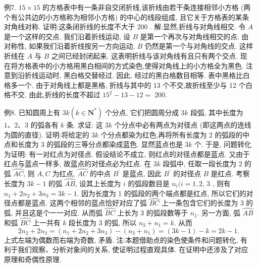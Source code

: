例7. $15 \times 15$ 的方格表中有一条非自交闭折线,该折线由若干条连接相邻小方格 (两个有公共边的小方格称为相邻小方格) 的中心的线段组成, 且它关于方格表的某条对角线对称.
证明:这条闭折线的长度不大于 200 .
解:显然,折线与对角线相交.
令 $A$ 是一个这样的交点.
我们沿着折线运动, 设 $B$ 是第一个再次与对角线相交的点.
由对称性, 如果我们沿着折线按另一方向运动, $B$ 仍然是第一个与对角线的交点.
这样折线在 $A$ 与 $B$ 之间已经封闭起来.
这表明折线与该对角线有且只有两个交点.
现在将方格表中的小方格用黑白相间的方式染色,使得对角线上的小方格全为黑色.
注意到沿折线运动时, 黑白格交替经过.
因此, 经过的黑白格数目相等.
表中黑格比白格多一个.
由于对角线上都是黑格, 折线与其中的 13 个不交,故折线至少与 12 个白格不交.
由此,折线的长度不超过 $15^2-13-12=$ 200.



例8. 已知圆周上有 $3 k\left(k \in \mathbf{N}^*\right)$ 个分点, 它们把圆周分成 $3 k$ 段弧, 其中长度为 $1 、 2 、 3$ 的弧各有 $k$ 条.
求证: 这 $3 k$ 个分点中必有两点为对径点 (即这两点的连线为圆的直径). 
证明:将给定的 $3 k$ 个分点都染为红色,再将所有长度为 2 的弧段的中点和长度为 3 的弧段的三等分点都染成蓝色.
显然蓝点也是 $3 k$ 个.
于是, 问题转化为证明: 有一对红点为对径点.
假设结论不成立, 则红点的对径点都是蓝点.
又由于红点与蓝点一样多, 故蓝点的对径点必为红点.
在 $3 k$ 段弧中, 任取一段长度为 2 的弧 $\overparen{A C}$, 则 $A, C$ 为红点, $\overparen{A C}$ 的中点 $B^{\prime}$ 是蓝点, 因此 $B^{\prime}$ 的对径点 $B$ 是红点.
考察长度为 $3 k-1$ 的弧 $\overparen{A B}$, 设其上长度为 $i$ 的弧段数目是 $n_i(i=1,2$, 3 , 则有 $n_1+2 n_2+3 n_3=3 k-1$. 因为长度为 1 的弧段的两个端点都是红点, 所以它们的对径点都是蓝点.
这两个相邻的蓝点恰好对应了弧 $\overparen{B C}$ 上一条包含它们的长度为 3 的弧, 并且这是个一一对应.
从而弧 $\overparen{B C}$ 上长为 3 的弧段数等于 $n_1$. 另一方面, 弧 $\overparen{A B}$ 和弧 $\overparen{B C}$ 上一共有 $k$ 段长度为 3 的弧, 所以 $n_3+n_1=k$. 从而
$$
2 n_2+2 n_3=\left(n_1+2 n_2+3 n_3\right)-\left(n_3+n_1\right)=(3 k-1)-k=2 k-1 .
$$
上式左端为偶数而右端为奇数, 矛盾.
注:本题借助点的染色使条件和问题转化, 有利于我们观察、分析对象间的关系, 使证明过程直观具体.
在证明中还涉及了对应原理和奇偶性原理.


